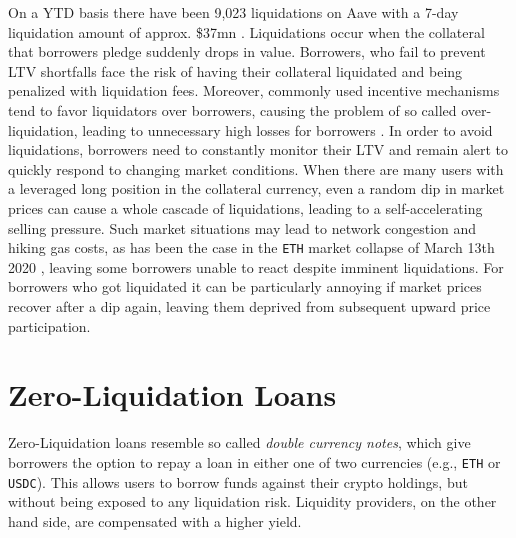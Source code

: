 \documentclass[a4paper]{article}
\begin{document}
On a YTD basis there have been 9,023 liquidations on Aave with a 7-day liquidation amount of approx. \$37mn \cite{dune}. Liquidations occur when the collateral that borrowers pledge suddenly drops in value. Borrowers, who fail to prevent LTV shortfalls face the risk of having their collateral liquidated and being penalized with liquidation fees. Moreover, commonly used incentive mechanisms tend to favor liquidators over borrowers, causing the problem of so called over-liquidation, leading to unnecessary high losses for borrowers \cite{qin}. In order to avoid liquidations, borrowers need to constantly monitor their LTV and remain alert to quickly respond to changing market conditions. When there are many users with a leveraged long position in the collateral currency, even a random dip in market prices can cause a whole cascade of liquidations, leading to a self-accelerating selling pressure. Such market situations may lead to network congestion and hiking gas costs, as has been the case in the \verb|ETH| market collapse of March 13th 2020 \cite{qin}, leaving some borrowers unable to react despite imminent liquidations. For borrowers who got liquidated it can be particularly annoying if market prices recover after a dip again, leaving them deprived from subsequent upward price participation.\\



\section{Zero-Liquidation Loans}
\label{sec:zero_liquidation_loans}
Zero-Liquidation loans resemble so called \emph{double currency notes}, which give borrowers the option to repay a loan in either one of two currencies (e.g., \verb|ETH| or \verb|USDC|). This allows users to borrow funds against their crypto holdings, but without being exposed to any liquidation risk. Liquidity providers, on the other hand side, are compensated with a higher yield.\\
\end{document}
